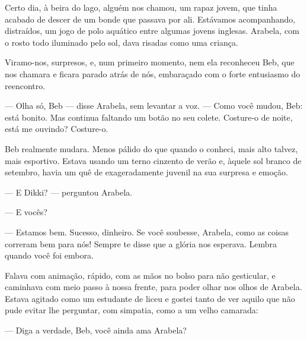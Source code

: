 
Certo dia, à beira do lago, alguém nos chamou, um rapaz jovem, que tinha
acabado de descer de um bonde que passava por ali. Estávamos
acompanhando, distraídos, um jogo de polo aquático entre algumas jovens
inglesas. Arabela, com o rosto todo iluminado pelo sol, dava risadas
como uma criança.

Viramo-nos, surpresos, e, num primeiro momento, nem ela reconheceu Beb,
que nos chamara e ficara parado atrás de nós, embaraçado com o forte
entusiasmo do reencontro.

--- Olha só, Beb --- disse Arabela, sem levantar a voz. --- Como você
mudou, Beb: está bonito. Mas continua faltando um botão no seu colete.
Costure-o de noite, está me ouvindo? Costure-o.

Beb realmente mudara. Menos pálido do que quando o conheci, mais alto
talvez, mais esportivo. Estava usando um terno cinzento de verão e,
àquele sol branco de setembro, havia um quê de exageradamente juvenil na
sua surpresa e emoção.


--- E Dikki? --- perguntou Arabela.


--- E vocês?

--- Estamos bem. Sucesso, dinheiro. Se você soubesse, Arabela, como as
coisas correram bem para nós! Sempre te disse que a glória nos esperava.
Lembra quando você foi embora.

Falava com animação, rápido, com as mãos no bolso para não gesticular, e
caminhava com meio passo à nossa frente, para poder olhar nos olhos de
Arabela. Estava agitado como um estudante de liceu e gostei tanto de ver
aquilo que não pude evitar lhe perguntar, com simpatia, como a um velho
camarada:

--- Diga a verdade, Beb, você ainda ama Arabela?


